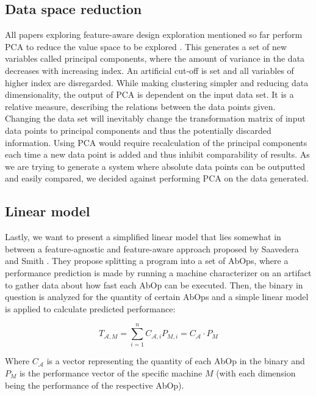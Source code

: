 \documentclass[../bachelor_paper.tex]{subfiles}
\begin{document}
\subsection{Data space reduction}
All papers exploring feature-aware design exploration mentioned so far perform \acl{PCA} to reduce the value space to be explored \cite{phansalkarMeasuringProgramSimilarity2005,joshiMeasuringBenchmarkSimilarity2006,eeckhoutQuantifyingImpactInput}. This generates a set of new variables called principal components, where the amount of variance in the data decreases with increasing index. An artificial cut-off is set and all variables of higher index are disregarded. While making clustering simpler and reducing data dimensionality, the output of \ac{PCA} is dependent on the input data set. It is a relative measure, describing the relations between the data points given.  Changing the data set will inevitably change the transformation matrix of input data points to principal components and thus the potentially discarded information. Using \ac{PCA} would require recalculation of the principal components each time a new data point is added and thus inhibit comparability of results. As we are trying to generate a system where absolute data points can be outputted and easily compared, we decided against performing \ac{PCA} on the data generated.

\subsection{Linear model}
Lastly, we want to present a simplified linear model that lies somewhat in between a feature-agnostic and feature-aware approach proposed by Saavedera and Smith \cite{saavedraAnalysisBenchmarkCharacteristics1996}. They propose splitting a program into a set of \acp{AbOp}, where a performance prediction is made by running a machine characterizer on an artifact to gather data about how fast each \ac{AbOp} can be executed. Then, the binary in question is analyzed for the quantity of certain \acp{AbOp} and a simple linear model is applied to calculate predicted performance:

\begin{equation}
\label{eq:theo/simi/hybr/mode}
T_{\mathcal{A},M} = \sum^n_{i = 1}C_{\mathcal{A},i}P_{M,i} = C_\mathcal{A} \cdot P_M
\end{equation}

Where $C_{\mathcal{A}}$ is a vector representing the quantity of each \ac{AbOp} in the binary and $P_{M}$ is the performance vector of the specific machine $M$ (with each dimension being the performance of the respective \ac{AbOp}).
\end{document}
